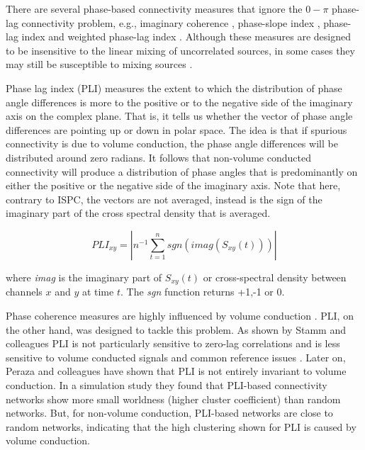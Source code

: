\documentclass[11pt, onecolumn]{article}
\begin{document}
There are several phase-based connectivity measures that ignore the $0-\pi$ phase-lag connectivity problem, e.g., imaginary coherence \citep{nolte2004identifying}, phase-slope index \citep{nolte2008robustly}, phase-lag index \citep{stam2007phase} and weighted phase-lag index \cite{vinck2011improved}. Although these measures are designed to be insensitive to the linear mixing of uncorrelated sources, in
some cases they may still be susceptible to mixing sources \citep{peraza2012volume}.

Phase lag index (PLI) measures the extent to which the distribution of phase angle differences is more to the positive or to the negative side of the imaginary axis on the complex plane. That is, it tells us whether the vector of phase angle differences are pointing up or down in polar space. The idea is that if spurious connectivity is due to volume conduction, the phase angle differences will be distributed around zero radians. It follows that non-volume conducted connectivity will produce a distribution of phase angles that is predominantly on either the positive or the negative side of the imaginary axis. Note that here, contrary to ISPC, the vectors are not averaged, instead is the sign of the imaginary part of the cross spectral density that is averaged.

\begin{equation}
PLI_{xy} = |n^{-1} \sum_{t=1}^{n}sgn(imag(S_{xy}(t)))|
\label{eq:pli}
\end{equation}

where \textit{imag} is the imaginary part of $S_{xy}(t)$ or cross-spectral density between channels $x$ and $y$ at time $t$.
The \textit{sgn} function returns +1,-1 or 0. %

Phase coherence measures are highly influenced by volume conduction  \citep{mormann2000mean}. 
PLI, on the other hand, was designed to tackle this problem. As shown by Stamm and colleagues PLI is not particularly sensitive to zero-lag correlations and is less sensitive to volume conducted signals and common reference issues \cite{stam2007phase}.
Later on, Peraza and colleagues \citep{peraza2012volume} have shown  that PLI is not entirely invariant to volume conduction. In a simulation study they found that PLI-based connectivity networks show more small worldness (higher cluster coefficient) than random networks. But, for non-volume conduction, PLI-based networks are close to random networks, indicating that the high clustering shown for PLI is caused by volume conduction. 
\end{document}
